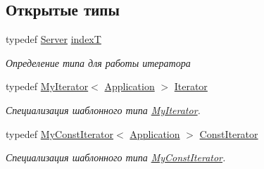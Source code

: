 \subsection*{Открытые типы}
\begin{DoxyCompactItemize}
\item 
typedef \hyperlink{class_network_service_1_1_server}{Server} \hyperlink{class_network_service_1_1_application_a4cbe718a4ebf378cf75cc55fe015177a}{index\+T}
\begin{DoxyCompactList}\small\item\em Определение типа для работы итератора \end{DoxyCompactList}\item 
typedef \hyperlink{class_network_service_1_1_my_iterator}{My\+Iterator}$<$ \hyperlink{class_network_service_1_1_application}{Application} $>$ \hyperlink{class_network_service_1_1_application_a206937019d86d3391a209e9883b44f7b}{Iterator}
\begin{DoxyCompactList}\small\item\em Специализация шаблонного типа \hyperlink{class_network_service_1_1_my_iterator}{My\+Iterator}. \end{DoxyCompactList}\item 
typedef \hyperlink{class_network_service_1_1_my_const_iterator}{My\+Const\+Iterator}$<$ \hyperlink{class_network_service_1_1_application}{Application} $>$ \hyperlink{class_network_service_1_1_application_a51fff3b7cce6bf84c2edbd887c0cac45}{Const\+Iterator}
\begin{DoxyCompactList}\small\item\em Специализация шаблонного типа \hyperlink{class_network_service_1_1_my_const_iterator}{My\+Const\+Iterator}. \end{DoxyCompactList}\end{DoxyCompactItemize}
